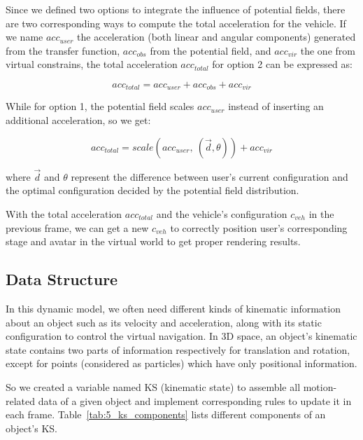 Since we defined two options to integrate the influence of potential fields, there are two corresponding ways to compute the total acceleration for the vehicle. If we name $acc_{user}$ the acceleration (both linear and angular components) generated from the transfer function, $acc_{obs}$ from the potential field, and $acc_{vir}$ the one from virtual constrains, the total acceleration $acc_{total}$ for option 2 can be expressed as:

\begin{equation}
acc_{total}=acc_{user}+acc_{obs}+acc_{vir}
\end{equation}

While for option 1, the potential field scales $acc_{user}$ instead of inserting an additional acceleration, so we get:

\begin{equation}
acc_{total}=scale(acc_{user},\: (\overrightarrow{d},\theta))+acc_{vir}
\end{equation}

where $\overrightarrow{d}$ and $\theta$ represent the difference between user's current configuration and the optimal configuration decided by the potential field distribution.

With the total acceleration $acc_{total}$ and the vehicle's configuration $c_{veh}$ in the previous frame, we can get a new $c_{veh}$ to correctly position user's corresponding stage and avatar in the virtual world to get proper rendering results.


\subsection{Data Structure}
In this dynamic model, we often need different kinds of kinematic information about an object such as its velocity and acceleration, along with its static configuration to control the virtual navigation. In 3D space, an object's kinematic state contains two parts of information respectively for translation and rotation, except for points (considered as particles) which have only positional information. 

So we created a variable named KS (kinematic state) to assemble all motion-related data of a given object and implement corresponding rules to update it in each frame. Table~\ref{tab:5_ks_components} lists different components of an object's KS.

